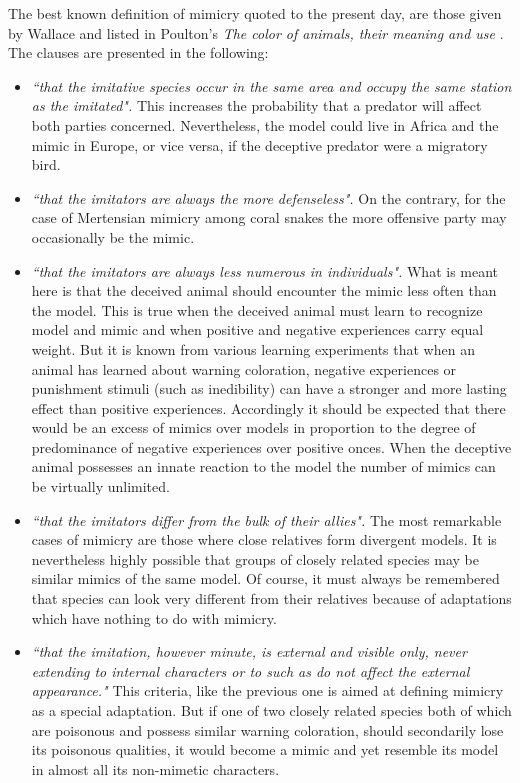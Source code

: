 The best known definition of mimicry quoted to the present day, are those given by Wallace and listed in Poulton's \textit{The color of animals, their meaning and use} \cite{poulton1890colours}. The clauses are presented in the following:

\begin{itemize}
	\item \textsl{``that the imitative species occur in the same area and occupy the same station as the imitated".} This increases the probability that a predator will affect both parties concerned. Nevertheless, the model could live in Africa and the mimic in Europe, or vice versa, if the deceptive predator were a migratory bird.
	\item \textsl{``that the imitators are always the more defenseless".} On the contrary, for the case of Mertensian mimicry among coral snakes the more offensive party may occasionally be the mimic.
	\item \textsl{``that the imitators are always less numerous in individuals".} What is meant here is that the deceived animal should encounter the mimic less often than the model. This is true when the deceived animal must learn to recognize model and mimic and when positive and negative experiences carry equal weight. But it is known from various learning experiments that when an animal has learned about warning coloration, negative experiences or punishment stimuli (such as inedibility) can have a stronger and more lasting effect than positive experiences. Accordingly it should be expected that there would be an excess of mimics over models in proportion to the degree of predominance of negative experiences over positive onces. When the deceptive animal possesses an innate reaction to the model the number of mimics can be virtually unlimited. 
	\item \textsl{``that the imitators differ from the bulk of their allies".} The most remarkable cases of mimicry are those where close relatives form divergent models. It is nevertheless highly possible that groups of closely related species may be similar mimics of the same model. Of course, it must always be remembered that species can look very different from their relatives because of adaptations which have nothing to do with mimicry. 
	\item \textsl{``that the imitation, however minute, is external and visible only, never extending to internal characters or to such as do not affect the external appearance."} This criteria, like the previous one is aimed at defining mimicry as a special adaptation. But if one of two closely related species both of which are poisonous and possess similar warning coloration, should secondarily lose its poisonous qualities, it would become a mimic and yet resemble its model in almost all its non-mimetic characters.
\end{itemize}

